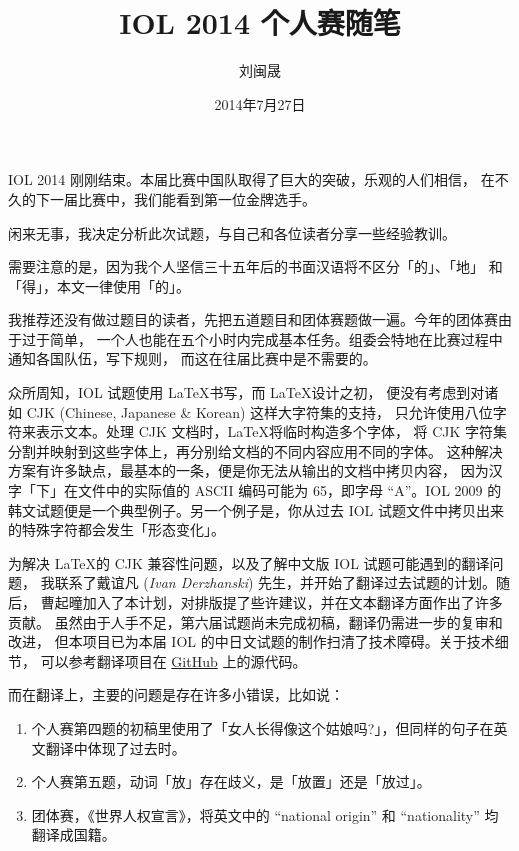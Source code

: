 \documentclass[11pt]{article}
\title{IOL 2014 个人赛随笔}
\date{2014年7月27日}
\author{刘闽晟}
\makeatletter
\renewcommand \section
{\@startsection{section}{1}{\z@}{-3ex}{1.5ex}{\LARGE\LantingDB}}
\newcommand \sq [1]{「#1」}
\newcommand \bookref [1]{《#1》}
\newcommand \westname [1]{\textit{#1}}
\makeatother
\begin{document}


\maketitle

IOL 2014 刚刚结束。本届比赛中国队取得了巨大的突破，乐观的人们相信，
在不久的下一届比赛中，我们能看到第一位金牌选手。

闲来无事，我决定分析此次试题，与自己和各位读者分享一些经验教训。

需要注意的是，因为我个人坚信三十五年后的书面汉语将不区分\sq{的}、\sq{地}
和\sq{得}，本文一律使用\sq{的}。

我推荐还没有做过题目的读者，先把五道题目和团体赛题做一遍。今年的团体赛由于过于简单，
一个人也能在五个小时内完成基本任务。组委会特地在比赛过程中通知各国队伍，写下规则，
而这在往届比赛中是不需要的。

\section{试题的制作与翻译}

众所周知，IOL 试题使用 \LaTeX 书写\cite{IOLEdit}，而 \LaTeX 设计之初，
便没有考虑到对诸如 CJK (Chinese, Japanese \& Korean) 这样大字符集的支持，
只允许使用八位字符来表示文本。处理 CJK 文档时，\LaTeX 将临时构造多个字体，
将 CJK 字符集分割并映射到这些字体上，再分别给文档的不同内容应用不同的字体。
这种解决方案有许多缺点，最基本的一条，便是你无法从输出的文档中拷贝内容，
因为汉字\sq{下}在文件中的实际值的 ASCII 编码可能为 65，即字母 “A”。IOL 2009
的韩文试题便是一个典型例子。另一个例子是，你从过去 IOL 试题文件中拷贝出来的特殊字符都会发生\sq{形态变化}。

为解决 \LaTeX 的 CJK 兼容性问题，以及了解中文版 IOL 试题可能遇到的翻译问题，
我联系了戴谊凡 (\westname{Ivan Derzhanski}) 先生，并开始了翻译过去试题的计划。随后，
曹起曈加入了本计划，对排版提了些许建议，并在文本翻译方面作出了许多贡献。
虽然由于人手不足，第六届试题尚未完成初稿，翻译仍需进一步的复审和改进，
但本项目已为本届 IOL 的中日文试题的制作扫清了技术障碍。关于技术细节，
可以参考翻译项目在 \href{https://github.com/notcome/IOL.cn}{GitHub} 上的源代码。

而在翻译上，主要的问题是存在许多小错误，比如说：

\begin{enumerate}
\item 个人赛第四题的初稿里使用了\sq{女人长得像这个姑娘吗?}，但同样的句子在英文翻译中体现了过去时。

\item 个人赛第五题，动词\sq{放}存在歧义，是\sq{放置}还是\sq{放过}。

\item 团体赛，\bookref{世界人权宣言}，将英文中的 “national origin” 和 “nationality” 均翻译成国籍。
\end{enumerate}
\end{document}
